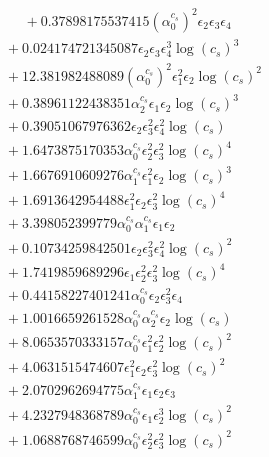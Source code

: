 \documentclass[10pt]{article}
\begin{document}
\begin{align*}
\phantom{F_{s,5}} &\phantom{={}}{}  + 0.37898175537415 \left(\alpha_{0}^{c_s}\right)^{2} \epsilon_{2} \epsilon_{3} \epsilon_{4} \\
&{}  + 0.024174721345087 \epsilon_{2} \epsilon_{3} \epsilon_{4}^{3} \log{\left(c_{s} \right)}^{3} \\
&{}  + 12.381982488089 \left(\alpha_{0}^{c_s}\right)^{2} \epsilon_{1}^{2} \epsilon_{2} \log{\left(c_{s} \right)}^{2} \\
&{}  + 0.38961122438351 \alpha_{2}^{c_s} \epsilon_{1} \epsilon_{2} \log{\left(c_{s} \right)}^{3} \\
&{}  + 0.39051067976362 \epsilon_{2} \epsilon_{3}^{2} \epsilon_{4}^{2} \log{\left(c_{s} \right)} \\
&{}  + 1.6473875170353 \alpha_{0}^{c_s} \epsilon_{2}^{2} \epsilon_{3}^{2} \log{\left(c_{s} \right)}^{4} \\
&{}  + 1.6676910609276 \alpha_{1}^{c_s} \epsilon_{1}^{2} \epsilon_{2} \log{\left(c_{s} \right)}^{3} \\
&{}  + 1.6913642954488 \epsilon_{1}^{2} \epsilon_{2} \epsilon_{3}^{2} \log{\left(c_{s} \right)}^{4} \\
&{}  + 3.398052399779 \alpha_{0}^{c_s} \alpha_{1}^{c_s} \epsilon_{1} \epsilon_{2} \\
&{}  + 0.10734259842501 \epsilon_{2} \epsilon_{3}^{2} \epsilon_{4}^{2} \log{\left(c_{s} \right)}^{2} \\
&{}  + 1.7419859689296 \epsilon_{1} \epsilon_{2}^{2} \epsilon_{3}^{2} \log{\left(c_{s} \right)}^{4} \\
&{}  + 0.44158227401241 \alpha_{0}^{c_s} \epsilon_{2} \epsilon_{3}^{2} \epsilon_{4} \\
&{}  + 1.0016659261528 \alpha_{0}^{c_s} \alpha_{2}^{c_s} \epsilon_{2} \log{\left(c_{s} \right)} \\
&{}  + 8.0653570333157 \alpha_{0}^{c_s} \epsilon_{1}^{2} \epsilon_{2}^{2} \log{\left(c_{s} \right)}^{2} \\
&{}  + 4.0631515474607 \epsilon_{1}^{2} \epsilon_{2} \epsilon_{3}^{2} \log{\left(c_{s} \right)}^{2} \\
&{}  + 2.0702962694775 \alpha_{1}^{c_s} \epsilon_{1} \epsilon_{2} \epsilon_{3} \\
&{}  + 4.2327948368789 \alpha_{0}^{c_s} \epsilon_{1} \epsilon_{2}^{3} \log{\left(c_{s} \right)}^{2} \\
&{}  + 1.0688768746599 \alpha_{0}^{c_s} \epsilon_{2}^{2} \epsilon_{3}^{2} \log{\left(c_{s} \right)}^{2} \\

\end{align*}
\end{document}
